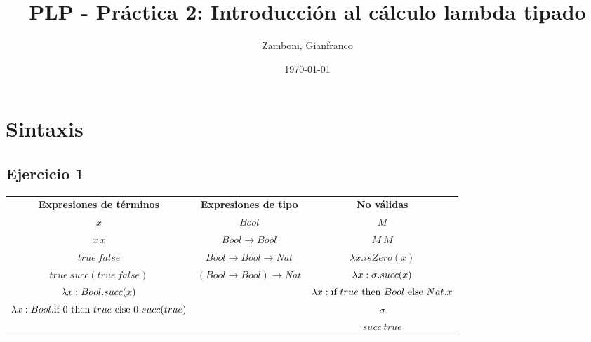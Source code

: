 \documentclass[10pt,a4paper, landscape]{article}
\begin{document}
\title{PLP - Práctica 2: Introducción al cálculo lambda tipado}

\date{\today}

\author{Zamboni, Gianfranco}

\maketitle
\setcounter{page}{1}


\section*{\centering Sintaxis}
\subsection{Ejercicio 1}
\begin{multicols}{2}

\end{multicols}

\vspace*{5mm}
\begin{center}
    \begin{tabular}{c|c|c}
        \textbf{Expresiones de términos} & \textbf{Expresiones de tipo} & \textbf{No válidas}\\
       $x$ & $ Bool$ & $M$ \\ 
       $x~x$ & $ Bool\to  Bool$ & $M~M$ \\      
       $true~false$ & $ Bool\to  Bool\to  Nat$ & $\lambda x.isZero(x)$ \\
       $true~succ(true~false)$ & $( Bool\to  Bool)\to  Nat$ & ${\lambda x: \sigma \text{.} succ(x)}$\\
       $\lambda x:  Bool \text{.} succ(x)$ & & $\lambda x:\text{if } true \text{ then }  Bool \text{ else }  Nat.x$ \\
       $\lambda x:  Bool \text{.} \text{if } 0 \text{ then } true \text{ else } 0~succ(true)$ & & $\sigma$ \\
       & & $succ~true$
    \end{tabular}
\end{center}
\end{document}
